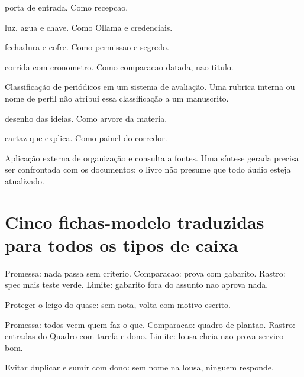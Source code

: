 \begin{descricao}
\begin{description}[style=nextline,leftmargin=1.3em,itemsep=5pt]
\item[Interface.] porta de entrada. Como recepcao.
\item[Infra.] luz, agua e chave. Como Ollama e credenciais.
\item[Seguranca.] fechadura e cofre. Como permissao e segredo.
\item[Benchmark.] corrida com cronometro. Como comparacao datada, nao titulo.
\item[Qualis.] Classificação de periódicos em um sistema de avaliação. Uma rubrica interna ou nome de perfil não atribui essa classificação a um manuscrito.
\item[Mind map.] desenho das ideias. Como arvore da materia.
\item[Infografico.] cartaz que explica. Como painel do corredor.
\item[NotebookLM.] Aplicação externa de organização e consulta a fontes. Uma síntese gerada precisa ser confrontada com os documentos; o livro não presume que todo áudio esteja atualizado.
\end{description}
\end{descricao}

\section{Cinco fichas-modelo traduzidas para todos os tipos de caixa}


\begin{descricao}
Promessa: nada passa sem criterio. Comparacao: prova com gabarito. Rastro: spec mais teste verde. Limite: gabarito fora do assunto nao aprova nada.
\end{descricao}

\begin{funcao}
Proteger o leigo do quase: sem nota, volta com motivo escrito.
\end{funcao}


\begin{descricao}
Promessa: todos veem quem faz o que. Comparacao: quadro de plantao. Rastro: entradas do Quadro com tarefa e dono. Limite: lousa cheia nao prova servico bom.
\end{descricao}

\begin{funcao}
Evitar duplicar e sumir com dono: sem nome na lousa, ninguem responde.
\end{funcao}


